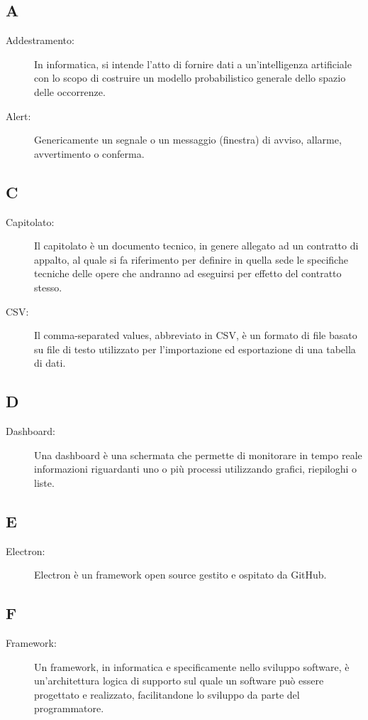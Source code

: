 \documentclass[../manuale-utente.tex]{subfiles}
\begin{document}
\subsection*{A}
\begin{description}
    \item[Addestramento:] In informatica, si intende l'atto di fornire dati a un'intelligenza artificiale con lo scopo di costruire un modello probabilistico generale dello spazio delle occorrenze.
    \item[Alert:] Genericamente un segnale o un messaggio (finestra) di avviso, allarme, avvertimento o conferma.
\end{description}

\subsection*{C}
\begin{description}
  \item[Capitolato:] Il capitolato è un documento tecnico, in genere allegato ad un contratto di appalto, al quale si fa riferimento per definire in quella sede le specifiche tecniche delle opere che andranno ad eseguirsi per effetto del contratto stesso.
  \item[CSV:] Il comma-separated values, abbreviato in CSV, è un formato di file basato su file di testo utilizzato per l'importazione ed esportazione di una tabella di dati.
\end{description}

\subsection*{D}
\begin{description}
  \item[Dashboard:] Una dashboard è una schermata che permette di monitorare in tempo reale informazioni riguardanti uno o più processi utilizzando grafici, riepiloghi o liste.
\end{description}

\subsection*{E}
\begin{description}
  \item[Electron:] Electron è un framework open source gestito e ospitato da GitHub.
\end{description}

\subsection*{F}
\begin{description}
  \item[Framework:] Un framework, in informatica e specificamente nello sviluppo software, è un'architettura logica di supporto sul quale un software può essere progettato e realizzato, facilitandone lo sviluppo da parte del programmatore.
\end{description}
\end{document}

